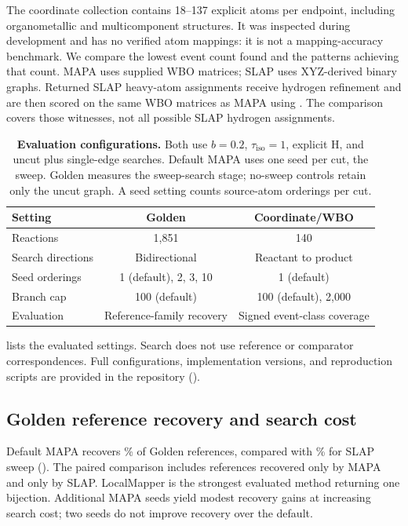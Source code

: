 The coordinate collection contains 18--137 explicit atoms per endpoint, including organometallic and multicomponent structures. It was inspected during development and has no verified atom mappings: it is not a mapping-accuracy benchmark. We compare the lowest event count found and the patterns achieving that count. MAPA uses supplied WBO matrices; SLAP uses XYZ-derived binary graphs. Returned SLAP heavy-atom assignments receive hydrogen refinement and are then scored on the same WBO matrices as MAPA using . The comparison covers those witnesses, not all possible SLAP hydrogen assignments.

\begin{table}[tb]
\centering\small
\caption{\textbf{Evaluation configurations.} Both use $b=0.2$, $\tau_{\mathrm{iso}}=1$, explicit H, and uncut plus single-edge searches. Default MAPA uses one seed per cut, the sweep. Golden measures the sweep-search stage; no-sweep controls retain only the uncut graph. A seed setting counts source-atom orderings per cut.}
\label{tab:protocol}
\begin{tabular}{lcc}\toprule
Setting & Golden & Coordinate/WBO\\\midrule
Reactions & 1,851 & 140\\
Search directions & Bidirectional & Reactant to product\\
Seed orderings & 1 (default), 2, 3, 10 & 1 (default)\\
Branch cap & 100 (default) & 100 (default), 2,000\\
Evaluation & Reference-family recovery & Signed event-class coverage\\\bottomrule
\end{tabular}
\end{table}

 lists the evaluated settings. Search does not use reference or comparator correspondences. Full configurations, implementation versions, and reproduction scripts are provided in the repository ().

\subsection{Golden reference recovery and search cost}

Default MAPA recovers \GoldenOnePercent\% of Golden references, compared with \SlapPercent\% for SLAP sweep (). The paired comparison includes \AamOnly{} references recovered only by MAPA and \SlapOnly{} only by SLAP. LocalMapper is the strongest evaluated method returning one bijection. Additional MAPA seeds yield modest recovery gains at increasing search cost; two seeds do not improve recovery over the default.

